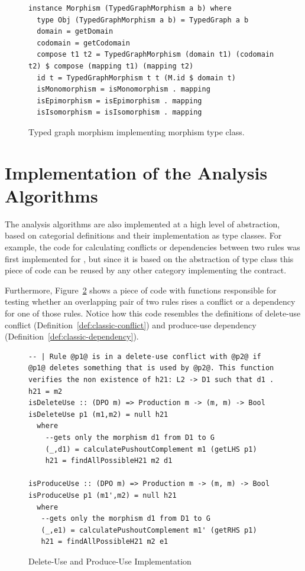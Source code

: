 \begin{figure}[!ht]
\caption{Typed graph morphism implementing morphism type class.}
\begin{verbatim}
instance Morphism (TypedGraphMorphism a b) where
  type Obj (TypedGraphMorphism a b) = TypedGraph a b
  domain = getDomain
  codomain = getCodomain
  compose t1 t2 = TypedGraphMorphism (domain t1) (codomain t2) $ compose (mapping t1) (mapping t2)
  id t = TypedGraphMorphism t t (M.id $ domain t)
  isMonomorphism = isMonomorphism . mapping
  isEpimorphism = isEpimorphism . mapping
  isIsomorphism = isIsomorphism . mapping
\end{verbatim}
\label{fig:verigraph:morphism-implementation}
\end{figure}

\section{Implementation of the Analysis Algorithms}

The analysis algorithms are also implemented at a high level of abstraction, based on categorial definitions and their implementation as type classes. For example, the code for calculating conflicts or dependencies between two rules was first implemented for , but since it is based on the abstraction of  type class this piece of code can be reused by any other category implementing the  contract.

Furthermore, Figure~\ref{fig:verigraph:delete-use-produce-use} shows a piece of code with functions responsible for testing whether an overlapping pair of two rules rises a conflict or a dependency for one of those rules. Notice how this code resembles the definitions of delete-use conflict (Definition~\ref{def:classic-conflict}) and produce-use dependency (Definition~\ref{def:classic-dependency}).


\begin{figure}[!ht]
\caption{Delete-Use and Produce-Use Implementation}
\begin{verbatim}
-- | Rule @p1@ is in a delete-use conflict with @p2@ if @p1@ deletes something that is used by @p2@. This function verifies the non existence of h21: L2 -> D1 such that d1 . h21 = m2
isDeleteUse :: (DPO m) => Production m -> (m, m) -> Bool
isDeleteUse p1 (m1,m2) = null h21
  where
    --gets only the morphism d1 from D1 to G
    (_,d1) = calculatePushoutComplement m1 (getLHS p1) 
    h21 = findAllPossibleH21 m2 d1

isProduceUse :: (DPO m) => Production m -> (m, m) -> Bool
isProduceUse p1 (m1',m2) = null h21
  where
   --gets only the morphism d1 from D1 to G
   (_,e1) = calculatePushoutComplement m1' (getRHS p1)
   h21 = findAllPossibleH21 m2 e1
\end{verbatim}
\label{fig:verigraph:delete-use-produce-use}
\end{figure}

